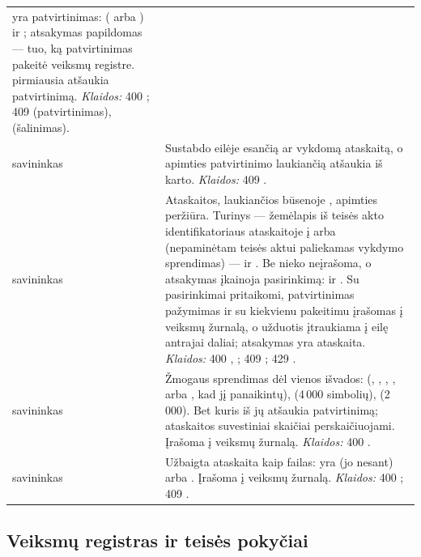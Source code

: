 \begin{xltabular}{\textwidth}{@{}L{19mm}Y@{}}
   yra patvirtinimas:  ( arba ) ir
  ; atsakymas papildomas  --- tuo, ką patvirtinimas pakeitė veiksmų
  registre.  pirmiausia atšaukia patvirtinimą. \emph{Klaidos:} 400
  ; 409  (patvirtinimas), 
  (šalinimas). \\
\addlinespace
{}
savininkas & Sustabdo eilėje esančią ar vykdomą ataskaitą, o apimties patvirtinimo laukiančią
  atšaukia iš karto. \emph{Klaidos:} 409 . \\
\addlinespace
{}
savininkas & Ataskaitos, laukiančios būsenoje , apimties peržiūra. Turinys
   --- žemėlapis iš teisės akto identifikatoriaus ataskaitoje į  arba
   (nepaminėtam teisės aktui paliekamas vykdymo sprendimas) --- ir . Be
   nieko neįrašoma, o atsakymas įkainoja pasirinkimą:  ir
  . Su  pasirinkimai pritaikomi, patvirtinimas pažymimas ir su
  kiekvienu pakeitimu įrašomas į veiksmų žurnalą, o užduotis įtraukiama į eilę antrajai daliai;
  atsakymas yra ataskaita. \emph{Klaidos:} 400 , ;
  409 ; 429 . \\
\addlinespace
{}
savininkas & Žmogaus sprendimas dėl vienos išvados:  (,
  , , ,  arba , kad jį
  panaikintų),  (4\,000 simbolių),  (2\,000). Bet kuris iš jų
  atšaukia patvirtinimą; ataskaitos suvestiniai skaičiai perskaičiuojami. Įrašoma į veiksmų
  žurnalą. \emph{Klaidos:} 400 . \\
\addlinespace
{}
savininkas & Užbaigta ataskaita kaip failas:  yra  (jo nesant) arba
  . Įrašoma į veiksmų žurnalą. \emph{Klaidos:} 400 ; 409
  . \\
\end{xltabular}

\subsection{Veiksmų registras ir teisės pokyčiai}\label{sec:api:actions}

